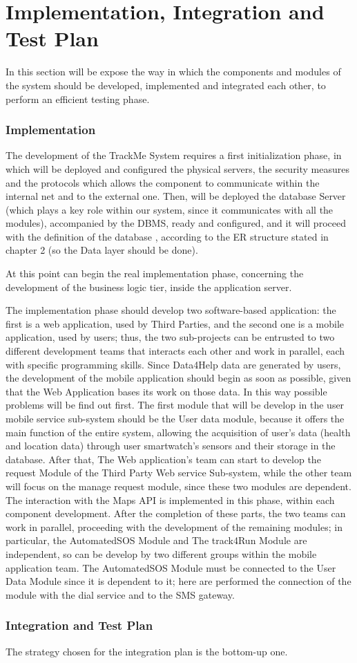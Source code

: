 \chapter{Implementation, Integration and Test Plan}
In this section will be expose the way in which the components and modules of the system should be developed, implemented and integrated each other, to perform an efficient testing phase.
\subsection{Implementation}

The development of the TrackMe System requires a first initialization phase, in which will be deployed and configured the physical servers, the security measures and the protocols which allows the component to communicate within the internal net and to the external one.
Then, will be deployed the database Server (which plays a key role within our system, since it communicates with all the modules),  accompanied by the DBMS, ready and configured, and it will proceed with the definition of the database , according to the ER structure stated in chapter 2 (so the Data layer should be done). 

At this point can begin the real implementation phase, concerning the development of the business logic tier, inside the application server.

The implementation phase should develop two software-based application:
the first is a web application, used by Third Parties, and the second one is a mobile application, used by users; thus, the two sub-projects can be entrusted to two different development teams that interacts each other and work in parallel, each with specific programming skills.
Since Data4Help data are generated by users, the development of the mobile application should begin as soon as possible, given that the Web Application bases its work on those data. In this way possible problems will be find out first.
The first module that will be develop in the user mobile service sub-system should be the User data module, because it offers the main function of the entire system, allowing the acquisition of user's data (health and location data) through user smartwatch's sensors and their storage in the database.
After that, The Web application's team can start to develop the request Module of the Third Party Web service Sub-system, while the other team will focus on  the manage request module, since these two modules are dependent.
The interaction with the Maps API is implemented in this phase, within each component development.
After the completion of these parts, the two teams can work in parallel, proceeding with the development of the remaining modules; in particular, the AutomatedSOS Module and The track4Run Module are independent, so can be develop by two different groups within the mobile application team.
The AutomatedSOS Module must be connected to the User Data Module since it is dependent to it; here are performed the connection of the module with the dial service and to the SMS gateway.


\subsection{Integration and Test Plan}
The strategy chosen for the integration plan is the bottom-up one.